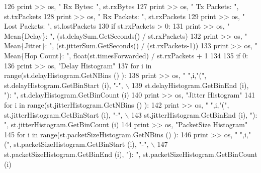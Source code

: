 \begin{DoxyCode}
126         \textcolor{keywordflow}{print} >> os, \textcolor{stringliteral}{"  Rx Bytes: "}, st.rxBytes
127         \textcolor{keywordflow}{print} >> os, \textcolor{stringliteral}{"  Tx Packets: "}, st.txPackets
128         \textcolor{keywordflow}{print} >> os, \textcolor{stringliteral}{"  Rx Packets: "}, st.rxPackets
129         \textcolor{keywordflow}{print} >> os, \textcolor{stringliteral}{"  Lost Packets: "}, st.lostPackets
130         \textcolor{keywordflow}{if} st.rxPackets > 0:
131             \textcolor{keywordflow}{print} >> os, \textcolor{stringliteral}{"  Mean\{Delay\}: "}, (st.delaySum.GetSeconds() / st.rxPackets)
132             \textcolor{keywordflow}{print} >> os, \textcolor{stringliteral}{"  Mean\{Jitter\}: "}, (st.jitterSum.GetSeconds() / (st.rxPackets-1))
133             \textcolor{keywordflow}{print} >> os, \textcolor{stringliteral}{"  Mean\{Hop Count\}: "}, float(st.timesForwarded) / st.rxPackets + 1
134 
135         \textcolor{keywordflow}{if} 0:
136             \textcolor{keywordflow}{print} >> os, \textcolor{stringliteral}{"Delay Histogram"}
137             \textcolor{keywordflow}{for} i \textcolor{keywordflow}{in} range(st.delayHistogram.GetNBins () ):
138               \textcolor{keywordflow}{print} >> os, \textcolor{stringliteral}{" "},i,\textcolor{stringliteral}{"("}, st.delayHistogram.GetBinStart (i), \textcolor{stringliteral}{"-"}, \(\backslash\)
139                   st.delayHistogram.GetBinEnd (i), \textcolor{stringliteral}{"): "}, st.delayHistogram.GetBinCount (i)
140             \textcolor{keywordflow}{print} >> os, \textcolor{stringliteral}{"Jitter Histogram"}
141             \textcolor{keywordflow}{for} i \textcolor{keywordflow}{in} range(st.jitterHistogram.GetNBins () ):
142               \textcolor{keywordflow}{print} >> os, \textcolor{stringliteral}{" "},i,\textcolor{stringliteral}{"("}, st.jitterHistogram.GetBinStart (i), \textcolor{stringliteral}{"-"}, \(\backslash\)
143                   st.jitterHistogram.GetBinEnd (i), \textcolor{stringliteral}{"): "}, st.jitterHistogram.GetBinCount (i)
144             \textcolor{keywordflow}{print} >> os, \textcolor{stringliteral}{"PacketSize Histogram"}
145             \textcolor{keywordflow}{for} i \textcolor{keywordflow}{in} range(st.packetSizeHistogram.GetNBins () ):
146               \textcolor{keywordflow}{print} >> os, \textcolor{stringliteral}{" "},i,\textcolor{stringliteral}{"("}, st.packetSizeHistogram.GetBinStart (i), \textcolor{stringliteral}{"-"}, \(\backslash\)
147                   st.packetSizeHistogram.GetBinEnd (i), \textcolor{stringliteral}{"): "}, st.packetSizeHistogram.GetBinCount (i)

\end{DoxyCode}
